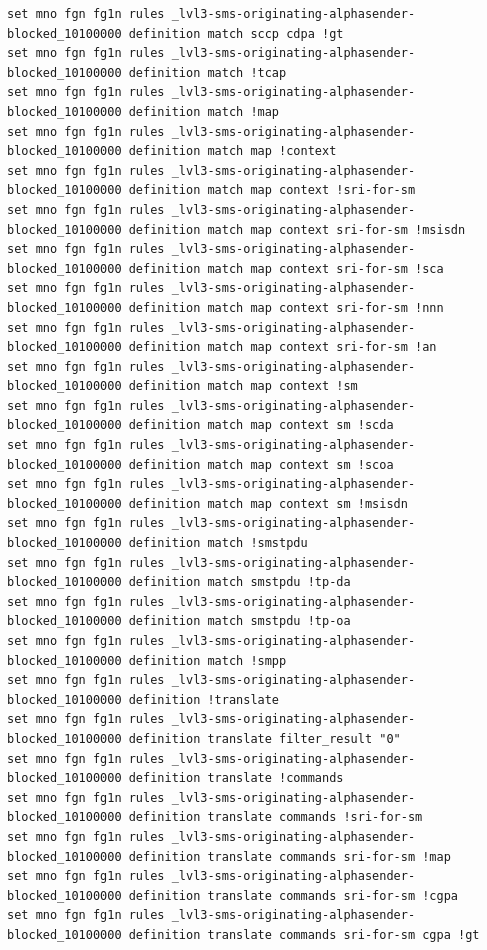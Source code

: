 \documentclass[a4paper,latin]{paper}
\begin{document}
\begin{lstlisting}[style=BashInputStyle]
set mno fgn fg1n rules _lvl3-sms-originating-alphasender-blocked_10100000 definition match sccp cdpa !gt
set mno fgn fg1n rules _lvl3-sms-originating-alphasender-blocked_10100000 definition match !tcap
set mno fgn fg1n rules _lvl3-sms-originating-alphasender-blocked_10100000 definition match !map
set mno fgn fg1n rules _lvl3-sms-originating-alphasender-blocked_10100000 definition match map !context
set mno fgn fg1n rules _lvl3-sms-originating-alphasender-blocked_10100000 definition match map context !sri-for-sm
set mno fgn fg1n rules _lvl3-sms-originating-alphasender-blocked_10100000 definition match map context sri-for-sm !msisdn
set mno fgn fg1n rules _lvl3-sms-originating-alphasender-blocked_10100000 definition match map context sri-for-sm !sca
set mno fgn fg1n rules _lvl3-sms-originating-alphasender-blocked_10100000 definition match map context sri-for-sm !nnn
set mno fgn fg1n rules _lvl3-sms-originating-alphasender-blocked_10100000 definition match map context sri-for-sm !an
set mno fgn fg1n rules _lvl3-sms-originating-alphasender-blocked_10100000 definition match map context !sm
set mno fgn fg1n rules _lvl3-sms-originating-alphasender-blocked_10100000 definition match map context sm !scda
set mno fgn fg1n rules _lvl3-sms-originating-alphasender-blocked_10100000 definition match map context sm !scoa
set mno fgn fg1n rules _lvl3-sms-originating-alphasender-blocked_10100000 definition match map context sm !msisdn
set mno fgn fg1n rules _lvl3-sms-originating-alphasender-blocked_10100000 definition match !smstpdu
set mno fgn fg1n rules _lvl3-sms-originating-alphasender-blocked_10100000 definition match smstpdu !tp-da
set mno fgn fg1n rules _lvl3-sms-originating-alphasender-blocked_10100000 definition match smstpdu !tp-oa
set mno fgn fg1n rules _lvl3-sms-originating-alphasender-blocked_10100000 definition match !smpp
set mno fgn fg1n rules _lvl3-sms-originating-alphasender-blocked_10100000 definition !translate
set mno fgn fg1n rules _lvl3-sms-originating-alphasender-blocked_10100000 definition translate filter_result "0"
set mno fgn fg1n rules _lvl3-sms-originating-alphasender-blocked_10100000 definition translate !commands
set mno fgn fg1n rules _lvl3-sms-originating-alphasender-blocked_10100000 definition translate commands !sri-for-sm
set mno fgn fg1n rules _lvl3-sms-originating-alphasender-blocked_10100000 definition translate commands sri-for-sm !map
set mno fgn fg1n rules _lvl3-sms-originating-alphasender-blocked_10100000 definition translate commands sri-for-sm !cgpa
set mno fgn fg1n rules _lvl3-sms-originating-alphasender-blocked_10100000 definition translate commands sri-for-sm cgpa !gt

\end{lstlisting}
\end{document}

